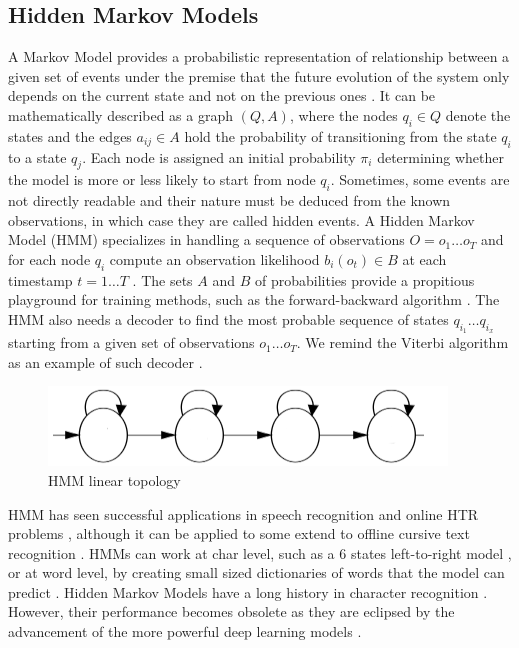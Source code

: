 \subsection{Hidden Markov Models}
\label{subsec:ch4sec1subsec1}

A Markov Model provides a probabilistic representation 
of relationship between a given set of events under the premise that the future evolution of the system only depends on the current state and not on the previous ones \cite{Jurafsky}. It can be mathematically described as a graph $(Q,A)$, where the nodes $q_i \in Q$ denote the states and the edges $a_{ij}\in A$ hold the probability of transitioning from the state $q_{i}$ to a state ${q_j}$. Each node is assigned an initial probability $\pi_i$ determining whether the model is more or less likely to start from node $q_i$. Sometimes, some events are not directly readable and their nature must be deduced from the known observations, in which case they are called hidden events. A Hidden Markov Model (HMM) specializes in handling a sequence of observations $O=o_1\ldots o_T$ and for each node ${q_i}$ compute an observation likelihood $b_i(o_t)\in B$ at each timestamp $t=1\ldots T$ \cite{Jurafsky}. The sets $A$ and $B$ of probabilities provide a propitious playground for training methods, such as the forward-backward algorithm \cite{Jurafsky}. The HMM also needs a decoder to find the most probable sequence of states $q_{i_1}\ldots q_{i_x}$ starting from a given set of observations $o_1\ldots o_T$. We remind the Viterbi algorithm as an example of such decoder \cite{Jurafsky}.

\begin{figure}[htbp]
	\centering
		\includegraphics[scale=1]{figures/hmm_lin}
	\caption{HMM linear topology \cite{hmm_linear_model}}
	\label{FigHMMLinear}        
\end{figure}


HMM has seen successful applications in speech recognition and online HTR problems \cite{Juan}, although it can be applied to some extend to offline cursive text recognition \cite{HMM_dict}. HMMs can work at char level, such as a 6 states left-to-right model \cite{HMM_char}, or at word level, by creating small sized dictionaries of words that the model can predict \cite{HMM_dict}. Hidden Markov Models have a long history in character recognition \cite{HmmSurvey}. However, their performance becomes obsolete as they are eclipsed by the advancement of the more powerful deep learning models \cite{cnnbilstm}.

